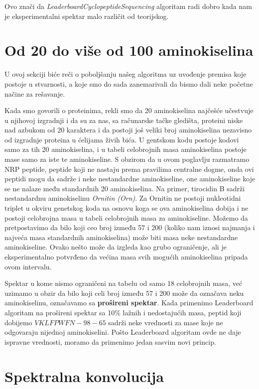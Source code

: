 Ovo znači da \textit{LeaderboardCyclopeptideSequencing} algoritam radi dobro kada nam je eksperimentalni spektar malo različit od teorijskog.

\section{Od 20 do više od 100 aminokiselina}

U ovoj sekciji biće reči o poboljšanju našeg algoritma uz uvođenje premisa koje postoje u stvarnosti, a koje smo do sada zanemarivali da bismo dali neke početne načine za rešavanje.

Kada smo govorili o proteinima, rekli smo da 20 aminokiselina najčešće učestvuje u njihovoj izgradnji i da su za nas, sa računarske tačke gledišta, proteini niske nad azbukom od 20 karaktera i da postoji još veliki broj aminokiselina nezavisno od izgradnje proteina u ćelijama živih bića. U gentskom kodu postoje kodovi samo za tih 20 aminokiselina, i u tabeli celobrojnih masa aminokiselina postoje mase samo za iste te aminokiseline. S obzirom da u ovom poglavlju razmatramo NRP peptide, peptide koji ne nastaju prema pravilima centralne dogme,  onda ovi peptidi mogu da sadrže i neke nestandardne aminokiseline, one aminokiseline koje se ne nalaze među standardnih 20 aminokiselina. Na primer, tirocidin B sadrži nestandardnu aminokiselinu \textit{Ornitin (Orn)}. Za Ornitin ne postoji nukleotidni triplet u okviru genetskog koda na osnovu koga se ova aminokiselina dobija i ne postoji celobrojna masa u tabeli celobrojnih masa za aminokiseline. Možemo da pretpostavimo da bilo koji ceo broj između 57 i 200 (koliko nam iznosi najmanja i najveća masa standardnih aminokiselina) može biti masa neke nestandardne aminokiseline. Ovako nešto može da izgleda kao grubo ograničenje, ali je eksperimentalno potvrđeno da većina masa svih mogućih aminokiselina pripada ovom intervalu.

Spektar u kome nismo ograničeni na tabelu od samo 18 celobrojnih masa, već uzimamo u obzir da bilo koji celi broj između 57 i 200 može da označava neku aminokiselinu, označavamo sa \textbf{prošireni spektar}. Kada primenimo Leaderboard algoritam na prošireni spektar sa 10\% lažnih i nedostajućih masa, peptid koji dobijemo $  VKLFPWFN-98-65 $ sadrži neke vrednosti za mase koje ne odgovaraju nijednoj aminokiselini. Pošto Leaderboard algoritam ovde ne daje ispravne vrednosti, moramo da primenimo jedan sasvim novi princip.

\section{Spektralna konvolucija}


